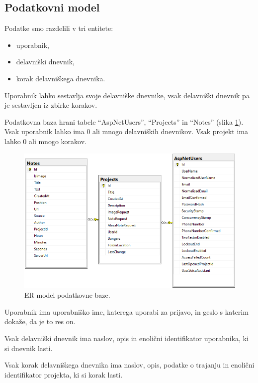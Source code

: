 \documentclass[a4paper, 12pt]{book}
\begin{document}
\subsection{Podatkovni model}

Podatke smo razdelili v tri entitete:
\begin{itemize}
	\item uporabnik,
	\item delavniški dnevnik,
	\item korak delavniškega dnevnika.
\end{itemize}

Uporabnik lahko sestavlja svoje delavniške dnevnike, vsak delavniški dnevnik pa je sestavljen iz zbirke korakov.

Podatkovna baza hrani tabele \enquote{AspNetUsers}, \enquote{Projects} in \enquote{Notes} (slika \ref{er_diagram}).
Vsak uporabnik lahko ima 0 ali mnogo delavniških dnevnikov.
Vsak projekt ima lahko 0 ali mnogo korakov.

\begin{figure}[H]
\begin{center}
\includegraphics[width=13.5cm]{er_diagram_small}
\end{center}
\caption{ER model podatkovne baze.}
\label{er_diagram}
\end{figure}

Uporabnik ima uporabniško ime, katerega uporabi za prijavo, in geslo s katerim dokaže, da je to res on.

Vsak delavniški dnevnik ima naslov, opis in enolični identifikator uporabnika, ki si dnevnik lasti.

Vsak korak delavniškega dnevnika ima naslov, opis, podatke o trajanju in enolični identifikator projekta, ki si korak lasti.
\end{document}
